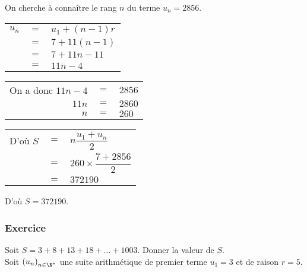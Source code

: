 On cherche à connaître le rang $n$ du terme $u_n = 2856$. \\

\begin{tabular}{lll}
$u_n$ & $=$ & $ u_1 + \left(n-1\right)r$ \\
& $=$ & $7 + 11\left(n-1\right)$ \\
& $=$ & $7 + 11n - 11$ \\
& $=$ & $11n - 4$ \\
\end{tabular}

\vspace*{.3cm}

\begin{tabular}{rll}
On a donc $11n - 4$ & $=$ & $2856$ \\
$11n$ & $=$ &$2860$ \\
$n$ & $=$ & $260$ \\ 
\end{tabular}

\vspace*{.3cm}

\begin{tabular}{lll}
D'où $S$ & $ \! \! \! \! \! \! \! \! \! \! =$ & $\! \! \! \! \! \! \! \! \! \! n\dfrac{u_1+u_n}{2}$ \vspace*{.3cm} \\
& $ \! \! \! \! \! \! \! \! \! \! =$ & $ \! \! \! \! \! 260 \times \dfrac{7 + 2856}{2}$ \vspace*{.3cm} \\
& $ \! \! \! \! \! \! \! \! \! \! =$ & $ \! \! \! \! \! 372 190$ \\
\end{tabular}

\vspace*{.3cm}

D'où $S = 372 190$.

\newpage

\vspace*{-1.8cm} 

\subsubsection{Exercice }

Soit $S = 3 + 8 + 13 + 18 + ... + 1003$. Donner la valeur de $S$. \\

Soit $\left(u_n\right)_{n \in \N^*}$ une suite arithmétique de premier terme $u_1 = 3$ et de raison $r = 5$. \\

